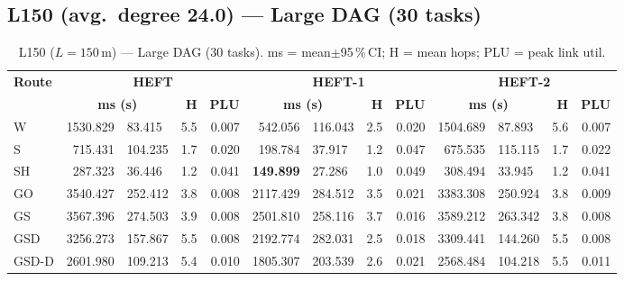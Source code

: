 \documentclass[11pt]{article}
\newcommand{\win}[1]{\textcolor{green!50!black}{\textbf{#1}}}
\newcommand{\bad}[1]{\textcolor{red!70!black}{#1}}
\begin{document}
\subsection{L150 (avg.\ degree 24.0) --- Large DAG (30 tasks)}
\begin{table}[H]\centering\small
\begin{tabular}{l r@{$\pm$}l r r r@{$\pm$}l r r r@{$\pm$}l r r}
\toprule
\textbf{Route} & \multicolumn{4}{c}{\textbf{HEFT}} & \multicolumn{4}{c}{\textbf{HEFT-1}} & \multicolumn{4}{c}{\textbf{HEFT-2}} \\
\cmidrule(lr){2-5}\cmidrule(lr){6-9}\cmidrule(lr){10-13}
& \multicolumn{2}{c}{\textbf{ms (s)}} & \textbf{H} & \textbf{PLU}& \multicolumn{2}{c}{\textbf{ms (s)}} & \textbf{H} & \textbf{PLU}& \multicolumn{2}{c}{\textbf{ms (s)}} & \textbf{H} & \textbf{PLU} \\
\midrule
  W & 1530.829 & 83.415 & 5.5 & 0.007 & 542.056 & 116.043 & 2.5 & 0.020 & 1504.689 & 87.893 & 5.6 & 0.007 \\
  S & 715.431 & 104.235 & 1.7 & 0.020 & 198.784 & 37.917 & 1.2 & 0.047 & 675.535 & 115.115 & 1.7 & 0.022 \\
  SH & 287.323 & 36.446 & 1.2 & 0.041 & \win{149.899} & 27.286 & 1.0 & 0.049 & 308.494 & 33.945 & 1.2 & 0.041 \\
  GO & 3540.427 & 252.412 & 3.8 & 0.008 & 2117.429 & 284.512 & 3.5 & 0.021 & 3383.308 & 250.924 & 3.8 & 0.009 \\
  GS & \bad{3567.396} & 274.503 & 3.9 & 0.008 & \bad{2501.810} & 258.116 & 3.7 & 0.016 & \bad{3589.212} & 263.342 & 3.8 & 0.008 \\
  GSD & 3256.273 & 157.867 & 5.5 & 0.008 & 2192.774 & 282.031 & 2.5 & 0.018 & 3309.441 & 144.260 & 5.5 & 0.008 \\
  GSD-D & 2601.980 & 109.213 & 5.4 & 0.010 & 1805.307 & 203.539 & 2.6 & 0.021 & 2568.484 & 104.218 & 5.5 & 0.011 \\
\bottomrule\end{tabular}
\caption{L150 ($L=150$\,m) --- Large DAG (30 tasks). ms = mean$\pm$95\,\%\,CI; H = mean hops; PLU = peak link util.}
\end{table}
\end{document}
